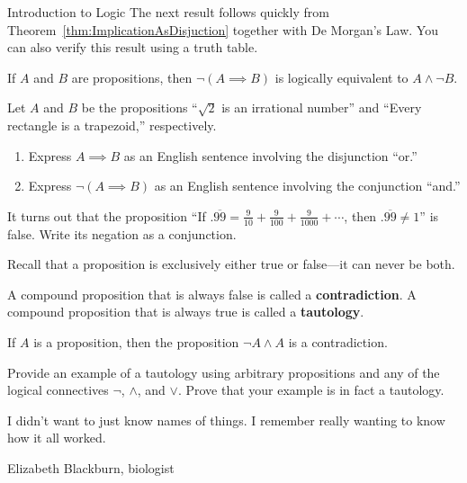 \begin{section}{Introduction to Logic}
The next result follows quickly from Theorem~\ref{thm:ImplicationAsDisjuction} together with De Morgan's Law. You can also verify this result using a truth table.

\begin{corollary}\label{cor:NegateImplication}
If $A$ and $B$ are propositions, then $\neg(A \implies B)$ is logically equivalent to $A \wedge \neg B$.
\end{corollary}

\begin{problem}\label{prob:Darth Vader}
Let $A$ and $B$ be the propositions ``$\sqrt{2}$ is an irrational number'' and ``Every rectangle is a trapezoid,'' respectively.
\begin{enumerate}[label=\textrm{(\alph*)}]
\item Express $A\implies B$ as an English sentence involving the disjunction ``or.''
\item Express $\neg(A\implies B)$ as an English sentence involving the conjunction ``and.''
\end{enumerate}
\end{problem}

\begin{problem}
It turns out that the proposition ``If $.\overline{99}=\frac{9}{10}+\frac{9}{100}+\frac{9}{1000}+\cdots$, then $.\overline{99}\neq 1$'' is false. Write its  negation as a conjunction.
\end{problem}

Recall that a proposition is exclusively either true or false---it can never be both.

\begin{definition}
A compound proposition that is always false is called a \textbf{contradiction}.  A compound proposition that is always true is called a \textbf{tautology}.
\end{definition}

\begin{theorem}
If $A$ is a proposition, then the proposition $\neg A\wedge A$ is a contradiction.
\end{theorem}

\begin{problem}
Provide an example of a tautology using arbitrary propositions and any of the logical connectives $\neg$, $\wedge$, and $\vee$.  Prove that your example is in fact a tautology.
\end{problem}

\epigraph{I didn't want to just know names of things. I remember really wanting to know how it all worked.}{Elizabeth Blackburn, biologist}

\end{section}